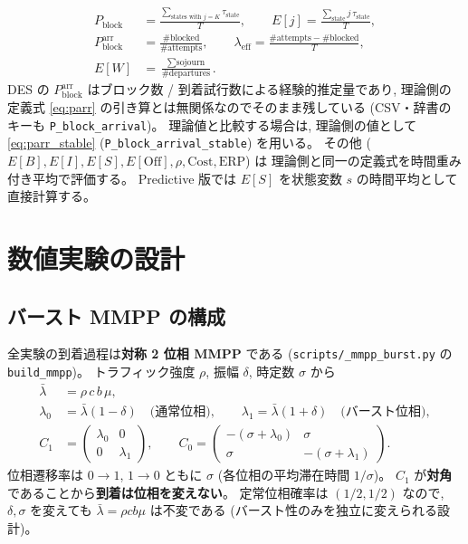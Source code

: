 \documentclass[a4paper,11pt]{article}
\newcommand{\code}[1]{\texttt{#1}}
\newcommand{\eff}{\mathrm{eff}}
\newcommand{\blk}{\mathrm{block}}
\begin{document}
\begin{align}
  P_\blk &= \frac{\sum_{\text{states with }j=K}\tau_{\text{state}}}{T},\qquad
  E[j] = \frac{\sum_{\text{state}} j\,\tau_{\text{state}}}{T},\\
  P_\blk^{\mathrm{arr}} &= \frac{\#\text{blocked}}{\#\text{attempts}},\qquad
  \lambda_\eff = \frac{\#\text{attempts}-\#\text{blocked}}{T},\\
  E[W] &= \frac{\sum \text{sojourn}}{\#\text{departures}}.
\end{align}
DES の $P_\blk^{\mathrm{arr}}$ はブロック数 / 到着試行数による経験的推定量であり,
理論側の定義式 \eqref{eq:parr} の引き算とは無関係なのでそのまま残している
(CSV・辞書のキーも \code{P\_block\_arrival})。
理論値と比較する場合は, 理論側の値として \eqref{eq:parr_stable}
(\code{P\_block\_arrival\_stable}) を用いる。
その他 ($E[B],E[I],E[S],E[\mathrm{Off}],\rho,\mathrm{Cost},\mathrm{ERP}$) は
理論側と同一の定義式を時間重み付き平均で評価する。
Predictive 版では $E[S]$ を状態変数 $s$ の時間平均として直接計算する。

\section{数値実験の設計}
\label{sec:experiments}

\subsection{バースト MMPP の構成}

全実験の到着過程は\textbf{対称 2 位相 MMPP} である
(\code{scripts/\_mmpp\_burst.py} の \code{build\_mmpp})。
トラフィック強度 $\rho$, 振幅 $\delta$, 時定数 $\sigma$ から
\begin{align}
  \bar\lambda &= \rho\, c\, b\, \mu, \\
  \lambda_0 &= \bar\lambda(1-\delta) \quad\text{(通常位相)}, \qquad
  \lambda_1 = \bar\lambda(1+\delta) \quad\text{(バースト位相)}, \\
  C_1 &= \begin{pmatrix}\lambda_0 & 0\\ 0 & \lambda_1\end{pmatrix},\qquad
  C_0 = \begin{pmatrix}-(\sigma+\lambda_0) & \sigma\\
                        \sigma & -(\sigma+\lambda_1)\end{pmatrix}.
\end{align}
位相遷移率は $0\to1$, $1\to0$ ともに $\sigma$ (各位相の平均滞在時間 $1/\sigma$)。
$C_1$ が\textbf{対角}であることから\textbf{到着は位相を変えない}。
定常位相確率は $(1/2,1/2)$ なので, $\delta,\sigma$ を変えても
$\bar\lambda=\rho c b\mu$ は不変である (バースト性のみを独立に変えられる設計)。
\end{document}
